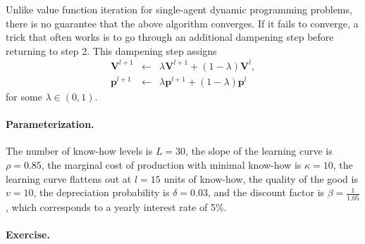\documentclass[11pt]{article}
\begin{document}
Unlike value function iteration for single-agent dynamic programming
problems, there is no guarantee that the above algorithm converges.
If it fails to converge, a trick that often works is to go through
an additional dampening step before returning to step 2. This
dampening step assigns
\begin{eqnarray*}
\mathbf{V}^{l+1} & \leftarrow & \lambda \mathbf{V}^{l+1} +(1-\lambda) \mathbf{V}^{l}, \\
\mathbf{p}^{l+1} & \leftarrow & \lambda \mathbf{p}^{l+1} +(1-\lambda) \mathbf{p}^{l}
\end{eqnarray*}
for some $\lambda \in (0,1)$.

\paragraph{Parameterization.}

The number of know-how levels is $L=30$, the slope of the learning
curve is $\rho=0.85$, the marginal cost of production with minimal
know-how is $\kappa=10$, the learning curve flattens out at $l=15$
units of know-how, the quality of the good is $v=10$, the
depreciation probability is $\delta=0.03$, and the discount factor
is $\beta=\frac{1}{1.05}$, which corresponds to a yearly interest
rate of 5\%.


\paragraph{Exercise.}
\end{document}

